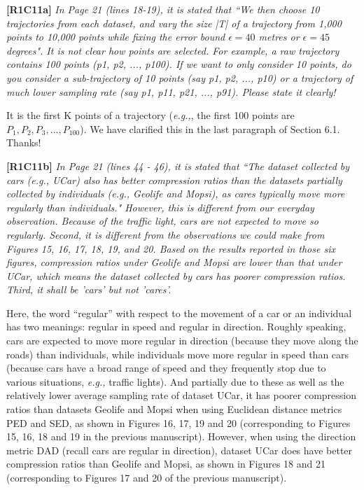 \documentclass{letter}
\newcommand{\eg}{\emph{e.g.,}\xspace}
\begin{document}
\textbf{[R1C11a]} \emph{ In Page 21 (lines 18-19), it is stated that ``We then choose 10 trajectories from each dataset, and vary the size |T| of a trajectory from 1,000 points to 10,000 points while fixing the error bound $\epsilon = 40$ metres or $\epsilon = 45$ degrees". It is not clear how points are selected. For example, a raw trajectory contains 100 points (p1, p2, ..., p100). If we want to only consider 10 points, do you consider a sub-trajectory of 10 points (say p1, p2, ..., p10) or a trajectory of much lower sampling rate (say p1, p11, p21, ..., p91). Please state it clearly!}

It is the first K points of a trajectory (\eg, the first 100 points are $P_1, P_2, P_3, ..., P_{100}$). We have clarified this in the last paragraph of Section 6.1. Thanks!

\textbf{[R1C11b]} \emph{ In Page 21 (lines 44 - 46), it is stated that ``The dataset collected by cars (e.g., UCar) also has better compression ratios than the datasets partially collected by individuals (e.g., Geolife and Mopsi), as cares typically move more regularly than individuals." However, this is different from our everyday observation. Because of the traffic light, cars are not expected to move so regularly. Second, it is different from the observations we could make from Figures 15, 16, 17, 18, 19, and 20. Based on the results reported in those six figures, compression ratios under Geolife and Mopsi are lower than that under UCar, which means the dataset collected by cars has poorer compression ratios. Third, it shall be 'cars' but not 'cares'. }

Here, the word ``regular'' with respect to the movement of a car or an individual has two meanings: regular in speed and regular in direction. Roughly speaking, cars are expected to move more regular in direction (because they move along the roads) than individuals, while individuals move more regular in speed than cars (because cars have a broad range of speed and they frequently stop due to various situations, \eg traffic lights).
And partially due to these as well as the relatively lower average sampling rate of dataset UCar, it has poorer compression ratios than datasets Geolife and Mopsi when using Euclidean distance metrics PED and SED, as shown in Figures 16, 17, 19 and 20 (corresponding to Figures 15, 16, 18 and 19 in the previous manuscript). However, when using the direction metric DAD (recall cars are regular in direction), dataset UCar does have better compression ratios than Geolife and Mopsi, as shown in Figures 18 and 21 (corresponding to Figures 17 and 20 of the previous manuscript).
\end{document}
